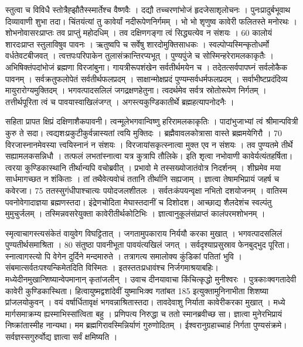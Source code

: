 स्तुत्वा च विविधै स्तोत्रैह्झौतैस्स्मार्तेश्च वैष्णवैः ।
 दद्यौ तच्चरणांभोजं हृदजेसाशृलोचनः ।
 पुनःप्रादुर्बभूवाथ दिव्यावाणी शुभा तदा।
 चिंतयंत्यां तु कावेर्यां नदीरूपेणनिर्गमम् ।
 भो भो शृणुष्व कावेरी फलितस्ते मनोरथः ।
 शोभनोवासरःप्राप्तः तव प्राप्तुं महोदधिम् ।
 तव दक्षिणगङ्गा त्वं सिद्ध्यत्येव न संशयः ।
 60 कालोयं शारदःप्राप्त स्तुलाविषुव पावनः ।
 ऋतुष्वपि च सर्वेषु शारदोमुक्तिसाधकः ।
 स्वल्पोप्यस्मिन्कृतोधर्मो वर्धतेवटबीजवत् ।
 त्वत्तपःपरिपाकेन तुलासंक्रान्तिरप्यभूत् ।
 पुण्यपुंजे च सोस्मिन्हरेरामलकाकृतैः ।
 अभिषिक्तंपदांभोजं ब्रह्मणा विरजांबुना।
 गायत्रीरूपशंखेन सर्वतीर्थमयेन च ।
 तदेतत्सर्वपापघ्नं सर्वलोकैक पावनम् ।
 सर्वक्रतुफलोपेतं सर्वतीर्थफलप्रदम् ।
 साक्षान्मोक्षप्रदं पुण्यम्सर्वधर्मफलप्रदम् ।
 सर्वाभीष्टप्रदंदिव्य मायुरारोग्यमुक्तिदम् ।
 भगवत्पादसलिलं जगद्रक्षणहेतुना।
 त्वदर्थमेव सर्वत्र स्रोतोरूपेण निर्गतम् ।
 तत्तीर्थपूरिता त्वं च पावयास्वाखिलंजग्त् ।
 अगस्त्यकुण्डिकातीर्थे ब्रह्महत्यापनोदनैः ।
 
सहिता प्रापत क्षिप्रं दक्षिणाशैकपावनी।
 त्वन्मूलेभगवान्विष्णु हरिरामलकाकृतिः ।
 पादांभुजाभ्यां त्वं श्रीमान्पवित्री कुरु ते सदा।
 त्वद्यशःप्रकुटीकुर्वन्नास्यतां त्वयि मुक्तिदः ।
 ब्रह्मैवावलकोत्रासा वास्ते ब्रह्ममयेगिरौ ।
 70 विरजास्नानमेवस्या त्त्वयिस्नानं न संशयः ।
 विरजायांसकृत्स्नात्वा मुक्त एव न संशयः ।
 तव पुण्यतमे तीर्थे सह्यामलकसन्निधौ ।
 तत्फलं लभतांस्नात्वा यत्र कुत्रापि तौलिके।
 इति शृत्वा नभोवाणी कावेर्यत्यंतहर्षिता।
 त्वरया कुण्डिकास्थानि तीर्थान्यपि वचोब्रवीत् ।
 प्रभावो मे तस्सख्योजातंवोत्र निदर्शनम् ।
 शीघ्रमेव मया सार्धमागच्छत न शंकिताः ।
 तां तथैवेत्यवोचं ततानि तीर्थानि सह्यजाम् ।
 ज्ञात्वा तेषामभिप्रायं जहर्ष च कवेरजा।
 75 ततस्सुगंधीपाश्चात्यः पयोदजलशीतलः ।
 सर्वतःकंपयन्वृक्षा नभितो दशयोजनम् ।
 वातिस्म पवनोवेगादाज्ञया ब्रह्मणस्तदा।
 इंद्रेणचोदिता मेघास्तदानीं च दिशोदश।
 आच्छाद्य शैलदेशंच स्वल्पंतु मुमुचुर्जलम् ।
 तस्मिन्नवसरेयुक्ता कावेरीतीर्थकोटिभिः ।
 ज्ञात्वानुकूलंसंप्राप्तं कालंपरमशोभनम् ।
 
स्मृत्वाचागस्त्यसंकेतं वायुवेग विघट्टितात् ।
 जगतामुपकाराय निर्ययौ करका मुखात् ।
 भगवत्पादसलिलं पुण्यतीर्थसमाश्रिता ।
 80 संतुष्ठा पावनीभूता पावयंत्यखिलं जगत् ।
 सर्वदृश्याप्रसुस्राव फेनबुद्भुद पूरिता।
 स्नात्वागस्त्यो पि वेगेन दुर्दिने मन्दमारुते ।
 तत्रागत्य समालोक्य कुंडिकां पतितां भुवि ।
 संबमात्सर्वतःपश्यन्किमेतदिति विस्मितः ।
 इतस्ततःप्रधावंश्च निर्जगमाश्रयाबहिः।
 मध्येदीनमुखान्शिष्यान्वेपमानान् कृतांजलीन् ।
 उवाच दीनयावाचा किंचित्कृद्धो मुनीश्वरः ।
 पुत्रकाःक्वगतादेवी कावेरी कुण्डिकास्थिता।
 हित्वायुष्मद्वशांदेवीं युष्माभिःक्व गतांबत 185 इत्युक्तामुनिनाभीता शिशष्या प्रांजलयोकुवन् ।
 वयं वर्षार्धितावृक्षं भगवन्नाश्रितास्तदा।
 तावदेवाशु निर्याता कावेरीकरका मुखात् ।
 मध्ये मार्गसमाक्रम्य ह्यस्माभिस्सांत्विता बहु ।
 प्रणिपत्य निरुद्धा च ततो स्मानब्रवीच्छ सा।
 ज्ञात्वा मुनेरभिप्रायं निष्क्रांतास्मीह नान्यथा।
 मम ब्रह्मगिरावस्मिन्निर्याणं गुरुणोदितम् ।
 ईश्वरानुग्रहाच्चाहं निर्गता पुण्यसंक्रमे।
 सर्वज्ञस्सगुरुर्वोद्य ज्ञात्वा सर्वं क्षमिष्यति ।
 
